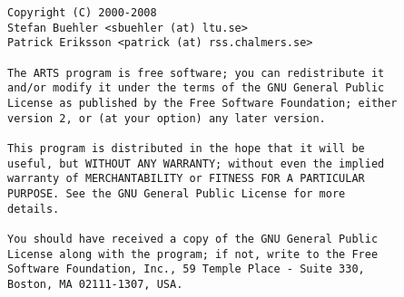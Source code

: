 \newpage                          
\thispagestyle{empty}
\vspace*{\fill}
\noindent
\begin{verbatim}
Copyright (C) 2000-2008
Stefan Buehler <sbuehler (at) ltu.se>
Patrick Eriksson <patrick (at) rss.chalmers.se>

The ARTS program is free software; you can redistribute it
and/or modify it under the terms of the GNU General Public
License as published by the Free Software Foundation; either
version 2, or (at your option) any later version.

This program is distributed in the hope that it will be
useful, but WITHOUT ANY WARRANTY; without even the implied
warranty of MERCHANTABILITY or FITNESS FOR A PARTICULAR
PURPOSE. See the GNU General Public License for more
details. 

You should have received a copy of the GNU General Public
License along with the program; if not, write to the Free
Software Foundation, Inc., 59 Temple Place - Suite 330,
Boston, MA 02111-1307, USA. 
\end{verbatim}



